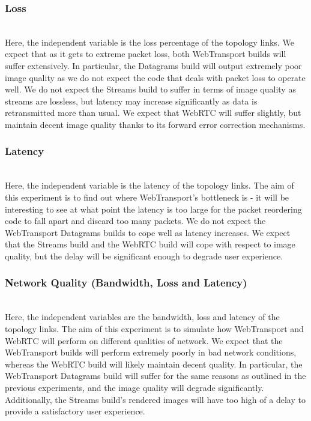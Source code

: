 \subsubsection*{Loss}
\hfill{}\\
Here, the independent variable is the loss percentage of the topology links. We expect that as it gets to extreme packet loss, both WebTransport builds will suffer extensively. In particular, the Datagrams build will output extremely poor image quality as we do not expect the code that deals with packet loss to operate well. We do not expect the Streams build to suffer in terms of image quality as streams are lossless, but latency may increase significantly as data is retransmitted more than usual. We expect that WebRTC will suffer slightly, but maintain decent image quality thanks to its forward error correction mechanisms.
\hfill{}\\
\subsubsection*{Latency}
\hfill{}\\
Here, the independent variable is the latency of the topology links. The aim of this experiment is to find out where WebTransport's bottleneck is - it will be interesting to see at what point the latency is too large for the packet reordering code to fall apart and discard too many packets. We do not expect the WebTransport Datagrams builds to cope well as latency increases. We expect that the Streams build and the WebRTC build will cope with respect to image quality, but the delay will be significant enough to degrade user experience.
\hfill{}\\
\subsubsection*{Network Quality (Bandwidth, Loss and Latency)}
\hfill{}\\
Here, the independent variables are the bandwidth, loss and latency of the topology links. The aim of this experiment is to simulate how WebTransport and WebRTC will perform on different qualities of network. We expect that the WebTransport builds will perform extremely poorly in bad network conditions, whereas the WebRTC build will likely maintain decent quality. In particular, the WebTransport Datagrams build will suffer for the same reasons as outlined in the previous experiments, and the image quality will degrade significantly. Additionally, the Streams build's rendered images will have too high of a delay to provide a satisfactory user experience.
\hfill{}\\

